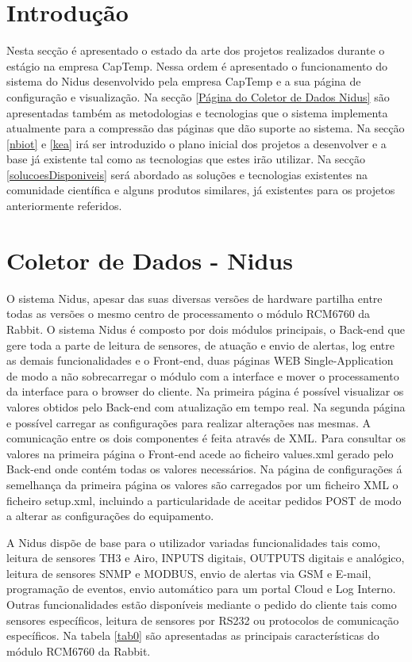 
\section{Introdução}
Nesta secção é apresentado o estado da arte dos projetos realizados durante o estágio na empresa CapTemp. Nessa ordem é apresentado o funcionamento do sistema do Nidus desenvolvido pela empresa CapTemp e a sua página de configuração e visualização. Na secção \ref{Página do Coletor de Dados Nidus} são apresentadas também as metodologias e tecnologias que o sistema implementa atualmente para a compressão das páginas que dão suporte ao sistema. Na secção \ref{nbiot} e \ref{kea}  irá ser introduzido o plano inicial dos projetos a desenvolver e a base já existente tal como as tecnologias que estes irão utilizar. Na secção \ref{solucoesDisponiveis} será abordado as soluções e tecnologias existentes na comunidade científica e alguns produtos similares, já existentes para os projetos anteriormente referidos.

\section{Coletor de Dados - Nidus} \label{Coletor de Dados - Nidus}
\par
O sistema Nidus, apesar das suas diversas versões de hardware partilha entre todas as versões o mesmo centro de processamento o módulo RCM6760 da Rabbit. O sistema Nidus é composto por dois módulos principais, o Back-end que gere toda a parte de leitura de sensores, de atuação e envio de alertas, log entre as demais funcionalidades e o Front-end, duas páginas WEB Single-Application de modo a não sobrecarregar o módulo com a interface e mover o processamento da interface para o browser do cliente. Na primeira página é possível visualizar os valores obtidos pelo Back-end com atualização em tempo real. Na segunda página e possível carregar as configurações para realizar alterações nas mesmas. A comunicação entre os dois componentes é feita através de XML. Para consultar os valores na primeira página o Front-end acede ao ficheiro values.xml gerado pelo Back-end onde contém todas os valores necessários. Na página de configurações á semelhança da primeira página os valores são carregados por um ficheiro XML o ficheiro setup.xml, incluindo a particularidade de aceitar pedidos POST de modo a alterar as configurações do equipamento.
\par A Nidus dispõe de base para o utilizador variadas funcionalidades tais como, leitura de sensores TH3 e Airo, INPUTS digitais, OUTPUTS digitais e analógico, leitura de sensores SNMP e MODBUS, envio de alertas via GSM e E-mail, programação de eventos, envio automático para um portal Cloud e Log Interno. Outras funcionalidades estão disponíveis mediante o pedido do cliente tais como sensores específicos, leitura de sensores por RS232 ou protocolos de comunicação específicos.
Na tabela \ref{tab0} são apresentadas as principais características do módulo RCM6760 da Rabbit.




